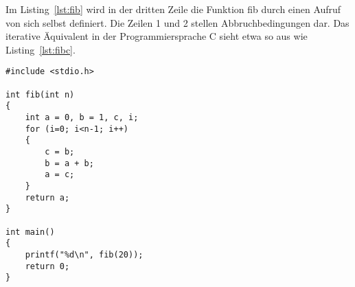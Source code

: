 Im Listing~\ref{lst:fib} wird in der dritten Zeile die Funktion fib durch einen Aufruf von sich selbst definiert. Die Zeilen 1 und 2 stellen Abbruchbedingungen dar. Das iterative Äquivalent in der Programmiersprache C sieht etwa so aus wie Listing~\ref{lst:fibc}. %
%
\begin{lstlisting}
#include <stdio.h>

int fib(int n)
{
    int a = 0, b = 1, c, i;
    for (i=0; i<n-1; i++)
    {
        c = b;
        b = a + b;
        a = c;
    }
    return a;
}

int main()
{
    printf("%d\n", fib(20));
    return 0;
}
\end{lstlisting}
%
%
